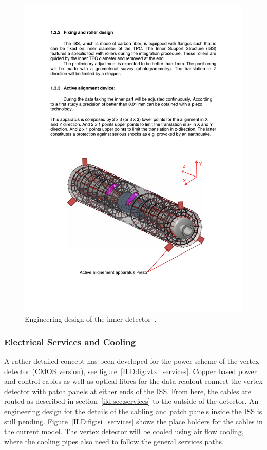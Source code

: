 \begin{figure}[h!]
    \centering
        \includegraphics[width=0.8\hsize]{Integration/fig/Inner_Detector_Integration.pdf}
    \caption{Engineering design of the inner detector~\cite{ild:bib:inner_detector_integration}.}
    \label{ILD:fig:inner_detector_integration}
\end{figure}

\subsubsection{Electrical Services and Cooling}
A rather detailed concept has been developed for the power scheme of the vertex detector (CMOS version), see figure~\ref{ILD:fig:vtx_services}. Copper based power and control cables as well as optical fibres for the data readout connect the vertex detector with patch panels at either ends of the ISS. From here, the cables are routed as described in section~\ref{ild:sec:services} to the outside of the detector. An engineering design for the details of the cabling and patch panels inside the ISS is still pending. Figure~\ref{ILD:fig:si_services} shows the place holders for the cables in the current model. The vertex detector will be cooled using air flow cooling, where the cooling pipes also need to follow the general services paths.

